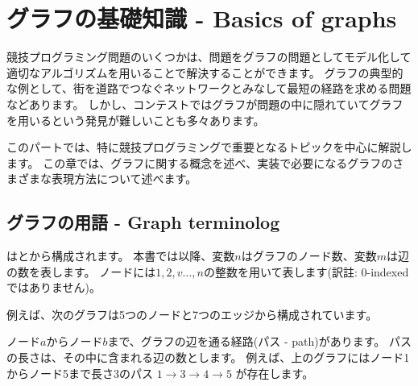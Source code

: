 \chapter{グラフの基礎知識 - Basics of graphs}

競技プログラミング問題のいくつかは、問題をグラフの問題としてモデル化して適切なアルゴリズムを用いることで解決することができます。
グラフの典型的な例として、街を道路でつなぐネットワークとみなして最短の経路を求める問題などあります。
しかし、コンテストではグラフが問題の中に隠れていてグラフを用いるという発見が難しいことも多々あります。

このパートでは、特に競技プログラミングで重要となるトピックを中心に解説します。
この章では、グラフに関する概念を述べ、実装で必要になるグラフのさまざまな表現方法について述べます。

\section{グラフの用語 - Graph terminolog}


はとから構成されます。
本書では以降、変数$n$はグラフのノード数、変数$m$は辺の数を表します。
ノードには$1,2,v \ldots ,n$の整数を用いて表します(訳註: 0-indexedではありません)。

例えば、次のグラフは5つのノードと7つのエッジから構成されています。

\begin{center}
\end{center}


ノード$a$からノード$b$まで、グラフの辺を通る経路(パス - path)があります。
パスの長さは、その中に含まれる辺の数とします。
例えば、上のグラフにはノード1からノード5まで長さ3のパス
 $1 \rightarrow 3 \rightarrow 4 \rightarrow 5$
 が存在します。


